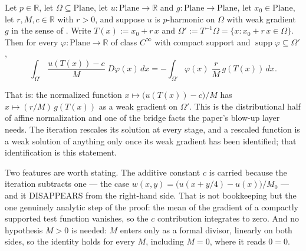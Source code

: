 \begin{lemma}
Let $p\in\mathbb{R}$, let $\Omega\subseteq\mathrm{Plane}$, let $u\colon\mathrm{Plane}\to
\mathbb{R}$ and $g\colon\mathrm{Plane}\to\mathrm{Plane}$, let $x_0\in\mathrm{Plane}$, let
$r,M,c\in\mathbb{R}$ with $r>0$, and suppose $u$ is $p$-harmonic on $\Omega$ with weak gradient
$g$ in the sense of .  Write $T(x):=x_0+r\,x$ and
$\Omega':=T^{-1}\Omega=\{x:x_0+r\,x\in\Omega\}$.  Then for every
$\varphi\colon\mathrm{Plane}\to\mathbb{R}$ of class $C^{\infty}$ with compact support and
$\operatorname{supp}\varphi\subseteq\Omega'$,
\[
  \int_{\Omega'}\frac{u(T(x))-c}{M}\;D\varphi(x)\,dx
  =-\int_{\Omega'}\varphi(x)\;\frac{r}{M}\,g(T(x))\,dx .
\]

That is: the normalized function $x\mapsto\bigl(u(T(x))-c\bigr)/M$ has
$x\mapsto(r/M)\,g(T(x))$ as a weak gradient on $\Omega'$.  This is the distributional half of
affine normalization and one of the bridge facts the paper's blow-up layer needs.  The iteration
rescales its solution at every stage, and a rescaled function is a weak solution of anything only
once its weak gradient has been identified; that identification is this statement.

Two features are worth stating.  The additive constant $c$ is carried because the iteration
subtracts one --- the case $w(x,y)=\bigl(u(x+y/4)-u(x)\bigr)/M_0$ --- and it DISAPPEARS from the
right-hand side.  That is not bookkeeping but the one genuinely analytic step of the proof: the
mean of the gradient of a compactly supported test function vanishes, so the $c$ contribution
integrates to zero.  And no hypothesis $M>0$ is needed: $M$ enters only as a formal divisor,
linearly on both sides, so the identity holds for every $M$, including $M=0$, where it reads
$0=0$.
\end{lemma}

